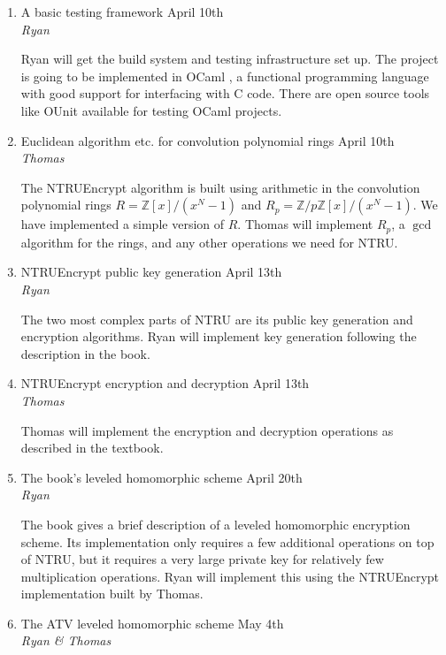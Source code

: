 \documentclass{article}
\begin{document}
\begin{enumerate}
\item A basic testing framework \dotfill April 10th \\
\emph{Ryan}

Ryan will get the build system and testing infrastructure set up. The project is going to be implemented in OCaml \cite{ocaml}, a functional programming language with good support for interfacing with C code. There are open source tools like OUnit \cite{ounit} available for testing OCaml projects.

\item Euclidean algorithm etc. for convolution polynomial rings \dotfill April 10th\\
\emph{Thomas}

The NTRUEncrypt algorithm is built using arithmetic in the convolution polynomial rings \(R = \mathbb{Z}[x]/(x^N - 1)\) and \(R_p = \mathbb{Z}/p\mathbb{Z}[x]/(x^N - 1)\). We have implemented a simple version of \(R\). Thomas will implement \(R_p\), a \(\operatorname{gcd}\) algorithm for the rings, and any other operations we need for NTRU.

\item NTRUEncrypt public key generation \dotfill April 13th \\
\emph{Ryan}

The two most complex parts of NTRU are its public key generation and encryption algorithms. Ryan will implement key generation following the description in the book.

\item NTRUEncrypt encryption and decryption \dotfill April 13th \\
\emph{Thomas}

Thomas will implement the encryption and decryption operations as described in the textbook.

\item The book's leveled homomorphic scheme \dotfill April 20th \\
\emph{Ryan} 

The book gives a brief description of a leveled homomorphic encryption scheme. Its implementation only requires a few additional operations on top of NTRU, but it requires a very large private key for relatively few multiplication operations. Ryan will implement this using the NTRUEncrypt implementation built by Thomas.

\item The ATV leveled homomorphic scheme \dotfill May 4th \\
\emph{Ryan \& Thomas}


\end{enumerate}
\end{document}
